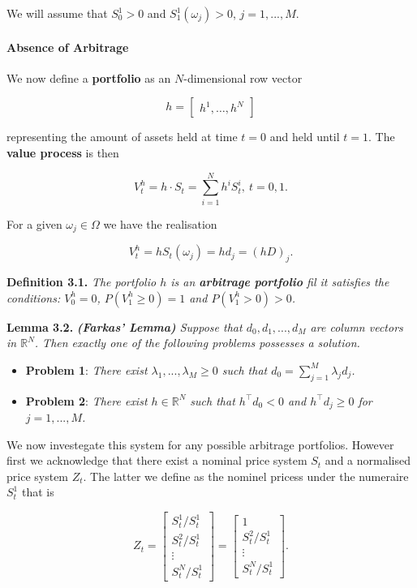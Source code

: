 \documentclass[
]{article}
\providecommand{\tightlist}{%
  \setlength{\itemsep}{0pt}\setlength{\parskip}{0pt}}
\begin{document}
We will assume that \(S_0^1>0\) and \(S_1^1(\omega_j)>0\),
\(j=1,...,M\).

\hypertarget{absence-of-arbitrage}{%
\paragraph{Absence of Arbitrage}\label{absence-of-arbitrage}}

We now define a \textbf{portfolio} as an \(N\)-dimensional row vector

\[
h=\begin{bmatrix} h^1, \dots,h^N\end{bmatrix}
\]

representing the amount of assets held at time \(t=0\) and held until
\(t=1\). The \textbf{value process} is then

\[
V^h_t=h\cdot S_t=\sum_{i=1}^N h^iS_t^i,\ t=0,1.
\]

For a given \(\omega_j\in\Omega\) we have the realisation

\[
V_t^h=hS_t(\omega_j)=hd_j=(hD)_j.
\]

\textbf{Definition 3.1.} \emph{The portfolio \(h\) is an
\textbf{arbitrage portfolio} fil it satisfies the conditions:
\(V_0^h=0\), \(P(V_1^h\ge 0)=1\) and \(P(V_1^h>0)>0\).}

\textbf{Lemma 3.2.} \emph{\textbf{(Farkas' Lemma)} Suppose that
\(d_0,d_1,...,d_M\) are column vectors in \(\mathbb{R}^N\). Then exactly
one of the following problems possesses a solution.}

\begin{itemize}
\tightlist
\item
  \textbf{Problem 1}: \emph{There exist \(\lambda_1,...,\lambda_M\ge0\)
  such that \(d_0=\sum_{j=1}^M\lambda_jd_j\).}
\item
  \textbf{Problem 2}: \emph{There exist \(h\in\mathbb{R}^N\) such that
  \(h^\top d_0<0\) and \(h^\top d_j\ge 0\) for \(j=1,...,M\).}
\end{itemize}

We now investegate this system for any possible arbitrage portfolios.
However first we acknowledge that there exist a nominal price system
\(S_t\) and a normalised price system \(Z_t\). The latter we define as
the nominel pricess under the numeraire \(S_t^1\) that is

\[
Z_t=\begin{bmatrix} S_t^1/S_t^1\\
S_t^2/S_t^1\\
\vdots\\
S_t^N/S_t^1\end{bmatrix}=\begin{bmatrix} 1\\
S_t^2/S_t^1\\
\vdots\\
S_t^N/S_t^1\end{bmatrix}.
\]
\end{document}
